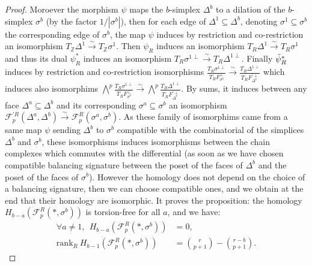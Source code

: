 \documentclass{article}
\begin{document}
\begin{proof}
    Moroever the morphism $\psi$ maps the $b$-simplex $\Delta^b$ to a dilation of the $b$-simplex $\sigma^b$ (by the factor $1/|\sigma^b|$), then for each edge of $\Delta^1\subseteq\Delta^b$, denoting $\sigma^1\subseteq \sigma^b$ the corresponding edge of $\sigma^b$, the map $\psi$ induces by restriction and co-restriction an isomorphism $T_{\mathbb{Z}}\Delta^1\overset{\sim}{\rightarrow} T_{\mathbb{Z}}\sigma^1$. Then $\psi_R$ induces an isomorphism $T_{R}\Delta^1\overset{\sim}{\rightarrow} T_{R}\sigma^1$ and thus its dual $\psi_R^*$ induces an isomorphism $T_{R}\sigma^{1\perp}\overset{\sim}{\rightarrow} T_{R}\Delta^{1\perp}$. Finally $\Tilde{\psi}_R^*$ induces by restriction and co-restriction isomorphisms $\frac{T_{R}\sigma^{1\perp}}{T_RF^{\perp}_{\sigma^b}}\overset{\sim}{\rightarrow} \frac{T_{R}\Delta^{1\perp}}{T_RF^{'\perp}_{\Delta^b}}$ which induces also isomorphims $ \bigwedge^p\frac{T_{R}\sigma^{1\perp}}{T_RF^{\perp}_{\sigma^b}}\overset{\sim}{\rightarrow} \bigwedge^p\frac{T_{R}\Delta^{1\perp}}{T_RF^{'\perp}_{\Delta^b}}$. By sums, it induces between any face $\Delta^a\subseteq \Delta^b$ and its corresponding $\sigma^a\subseteq\sigma^b$ an isomorphism $\mathcal{F}^{'R}_p(\Delta^a,\Delta^b)\overset{\sim}{\rightarrow}\mathcal{F}^R_p(\sigma^a,\sigma^b)$. As these family of isomorphims came from a same map $\psi$ sending $\Delta^b$ to $\sigma^b$ compatible with the combinatorial of the simplices $\Delta^b$ and $\sigma^b$, these isomorphisms induces isomorphisms between the chain complexes which commutes with the differential (as soon as we have chosen compatible balancing signature between the poset of the faces of $\Delta^b$ and the poset of the faces of $\sigma^b$). However the homology does not depend on the choice of a balancing signature, then we can choose compatible ones, and we obtain at the end that their homology are isomorphic. It proves the proposition: the homology $H_{b-a}(\mathcal{F}_p^R(*,\sigma^b))$ is torsion-free for all $a$, and we have:
    \begin{align*}
        \forall a \neq 1,~~ H_{b-a}(\mathcal{F}_p^R(*,\sigma^b))&=0, \\
        \mathrm{rank}_R ~H_{b-1}(\mathcal{F}_p^R(*,\sigma^b)) &= \binom{r}{p+1}-\binom{r-b}{p+1}.
    \end{align*}
    
\end{proof}
\end{document}

